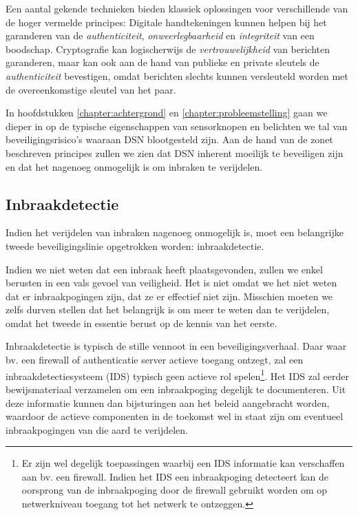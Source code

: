 Een aantal gekende technieken bieden klassiek oplossingen voor verschillende
van de hoger vermelde principes: Digitale handtekeningen kunnen helpen bij het
garanderen van de \emph{authenticiteit}, \emph{onweerlegbaarheid} en
\emph{integriteit} van een boodschap. Cryptografie kan logischerwijs de
\emph{vertrouwelijkheid} van berichten garanderen, maar kan ook aan de hand van
publieke en private sleutels de \emph{authenticiteit} bevestigen, omdat
berichten slechts kunnen versleuteld worden met de overeenkomstige sleutel van
het paar.

In hoofdstukken \ref{chapter:achtergrond} en \ref{chapter:probleemstelling}
gaan we dieper in op de typische eigenschappen van sensorknopen en belichten we
tal van beveiligingsrisico's waaraan DSN blootgesteld zijn. Aan de hand van de
zonet beschreven principes zullen we zien dat DSN inherent moeilijk te
beveiligen zijn en dat het nagenoeg onmogelijk is om inbraken te verijdelen.

\subsection{Inbraakdetectie}
\label{subsection:detection}

Indien het verijdelen van inbraken nagenoeg onmogelijk is, moet een belangrijke
tweede beveiligingslinie opgetrokken worden: inbraakdetectie.

Indien we niet weten dat een inbraak heeft plaatsgevonden, zullen we enkel
berusten in een vals gevoel van veiligheid. Het is niet omdat we het niet weten
dat er inbraakpogingen zijn, dat ze er effectief niet zijn. Misschien moeten we
zelfs durven stellen dat het belangrijk is om meer te weten dan te verijdelen,
omdat het tweede in essentie berust op de kennis van het eerste.

Inbraakdetectie is typisch de stille vennoot in een beveiligingsverhaal. Daar
waar bv. een firewall of authenticatie server actieve toegang ontzegt, zal een
inbraakdetectiesysteem (IDS) typisch geen actieve rol spelen\footnote{Er zijn
wel degelijk toepassingen waarbij een IDS informatie kan verschaffen aan bv.
een firewall. Indien het IDS een inbraakpoging detecteert kan de oorsprong van
de inbraakpoging door de firewall gebruikt worden om op netwerkniveau toegang
tot het netwerk te ontzeggen.}. Het IDS zal eerder bewijsmateriaal verzamelen
om een inbraakpoging degelijk te documenteren. Uit deze informatie kunnen dan
bijsturingen aan het beleid aangebracht worden, waardoor de actieve componenten
in de toekomst wel in staat zijn om eventueel inbraakpogingen van die aard te
verijdelen.

